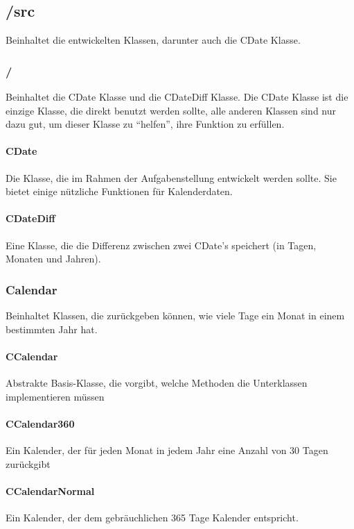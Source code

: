 \documentclass[12pt,pdftex,parskip=half]{scrartcl}
\begin{document}
    \clearpage


    \subsection{/src}
    Beinhaltet die entwickelten Klassen, darunter auch die CDate Klasse.


      \subsubsection{/}
      Beinhaltet die CDate Klasse und die CDateDiff Klasse. Die CDate Klasse ist die einzige Klasse, die direkt benutzt werden sollte, alle anderen Klassen sind nur dazu gut, um dieser Klasse zu "`helfen"', ihre Funktion zu erfüllen.

        \paragraph{CDate}
        Die Klasse, die im Rahmen der Aufgabenstellung entwickelt werden sollte.
        Sie bietet einige nützliche Funktionen für Kalenderdaten.

        \paragraph{CDateDiff}
        Eine Klasse, die die Differenz zwischen zwei CDate's speichert (in Tagen, Monaten und Jahren).


      \subsubsection{Calendar}
      Beinhaltet Klassen, die zurückgeben können, wie viele Tage ein Monat in einem bestimmten Jahr hat.

        \paragraph{CCalendar}
        Abstrakte Basis-Klasse, die vorgibt, welche Methoden die Unterklassen implementieren müssen

        \paragraph{CCalendar360}
        Ein Kalender, der für jeden Monat in jedem Jahr eine Anzahl von 30 Tagen zurückgibt

        \paragraph{CCalendarNormal}
        Ein Kalender, der dem gebräuchlichen 365 Tage Kalender entspricht.
\end{document}

